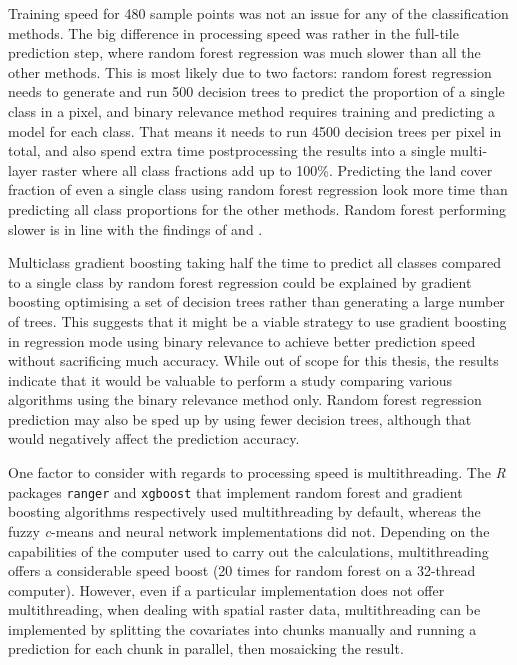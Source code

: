 \documentclass[a4paper,12pt]{scrbook}
\begin{document}
Training speed for 480 sample points was not an issue for any of the classification methods. The big difference in processing speed was rather in the full-tile prediction step, where random forest regression was much slower than all the other methods. This is most likely due to two factors: random forest regression needs to generate and run 500 decision trees to predict the proportion of a single class in a pixel, and binary relevance method requires training and predicting a model for each class. That means it needs to run 4500 decision trees per pixel in total, and also spend extra time postprocessing the results into a single multi-layer raster where all class fractions add up to 100\%. Predicting the land cover fraction of even a single class using random forest regression look more time than predicting all class proportions for the other methods. Random forest performing slower is in line with the findings of \citet{walton2008subpixelrf} and \citet{Pelletier2016hardrf}.

Multiclass gradient boosting taking half the time to predict all classes compared to a single class by random forest regression could be explained by gradient boosting optimising a set of decision trees rather than generating a large number of trees. This suggests that it might be a viable strategy to use gradient boosting in regression mode using binary relevance to achieve better prediction speed without sacrificing much accuracy. While out of scope for this thesis, the results indicate that it would be valuable to perform a study comparing various algorithms using the binary relevance method only. Random forest regression prediction may also be sped up by using fewer decision trees, although that would negatively affect the prediction accuracy.

One factor to consider with regards to processing speed is multithreading. The \textit{R} packages \texttt{ranger} and \texttt{xgboost} that implement random forest and gradient boosting algorithms respectively used multithreading by default, whereas the fuzzy \textit{c}-means and neural network implementations did not. Depending on the capabilities of the computer used to carry out the calculations, multithreading offers a considerable speed boost (20 times for random forest on a 32-thread computer). However, even if a particular implementation does not offer multithreading, when dealing with spatial raster data, multithreading can be implemented by splitting the covariates into chunks manually and running a prediction for each chunk in parallel, then mosaicking the result.
\end{document}
